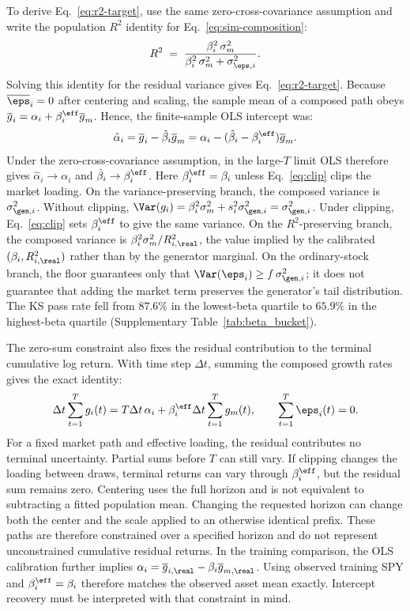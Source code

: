 To derive Eq.~\eqref{eq:r2-target}, use the same zero-cross-covariance
assumption and write the population $R^2$ identity for
Eq.~\eqref{eq:sim-composition}:
\begin{equation}
  R^2 \;=\; \frac{\beta_i^2\, \sigma_m^2}{\beta_i^2\, \sigma_m^2 + \sigma_{\eps,i}^2}.
\end{equation}
Solving this identity for the residual variance gives
Eq.~\eqref{eq:r2-target}.
Because $\overline{\eps}_i=0$ after centering and scaling, the sample
mean of a composed path obeys
$\overline{g}_i=\alpha_i+\beta_i^{\eff}\overline{g}_m$. Hence, the
finite-sample OLS intercept was:
\begin{equation}
  \hat\alpha_i
  = \overline{g}_i-\hat\beta_i\overline{g}_m
  = \alpha_i-(\hat\beta_i-\beta_i^{\eff})\overline{g}_m.
\end{equation}
Under the zero-cross-covariance assumption, in the large-$T$ limit OLS
therefore gives $\hat\alpha_i \to \alpha_i$ and
$\hat\beta_i \to \beta_i^{\eff}$. Here
$\beta_i^{\eff}=\beta_i$ unless Eq.~\eqref{eq:clip} clips the market
loading. On the variance-preserving branch, the composed variance is
$\sigma_{\gen,i}^2$. Without clipping,
$\Var(g_i) = \beta_i^2 \sigma_m^2 + s_i^2 \sigma_{\gen,i}^2
  = \sigma_{\gen,i}^2$. Under clipping, Eq.~\eqref{eq:clip} sets
$\beta_i^{\eff}$ to give the same variance. On the $R^2$-preserving
branch, the composed variance is
$\beta_i^2 \sigma_m^2 / R^2_{i,\real}$, the value implied by the
calibrated $(\beta_i, R^2_{i,\real})$ rather than by the generator
marginal. On the ordinary-stock branch, the floor guarantees only that
$\Var(\eps_i)\geq f\,\sigma_{\gen,i}^2$; it does not guarantee that
adding the market term preserves the generator's tail distribution.
The KS pass rate fell from $87.6\%$ in the lowest-beta quartile to
$65.9\%$ in the highest-beta quartile (Supplementary Table~\ref{tab:beta_bucket}).

The zero-sum constraint also fixes the residual contribution to the
terminal cumulative log return. With time step $\Delta t$, summing the
composed growth rates gives the exact identity:
\begin{equation}
  \Delta t\sum_{t=1}^{T} g_i(t)
  = T\Delta t\,\alpha_i
    + \beta_i^{\eff}\Delta t\sum_{t=1}^{T}g_m(t),
  \qquad \sum_{t=1}^{T}\eps_i(t)=0.
  \label{eq:supp-zero-sum-terminal}
\end{equation}
For a fixed market path and effective loading, the residual contributes
no terminal uncertainty. Partial sums before $T$ can still vary. If
clipping changes the loading between draws, terminal returns can vary
through $\beta_i^{\eff}$, but the residual sum remains zero. Centering
uses the full horizon and is not equivalent to subtracting a fitted
population mean. Changing the requested horizon can change both the
center and the scale applied to an otherwise identical prefix. These
paths are therefore constrained over a specified horizon and do not
represent unconstrained cumulative residual returns. In the training
comparison, the OLS calibration further implies
$\alpha_i=\overline{g}_{i,\real}-\beta_i\overline{g}_{m,\real}$.
Using observed training SPY and $\beta_i^{\eff}=\beta_i$ therefore
matches the observed asset mean exactly. Intercept recovery must be
interpreted with that constraint in mind.

